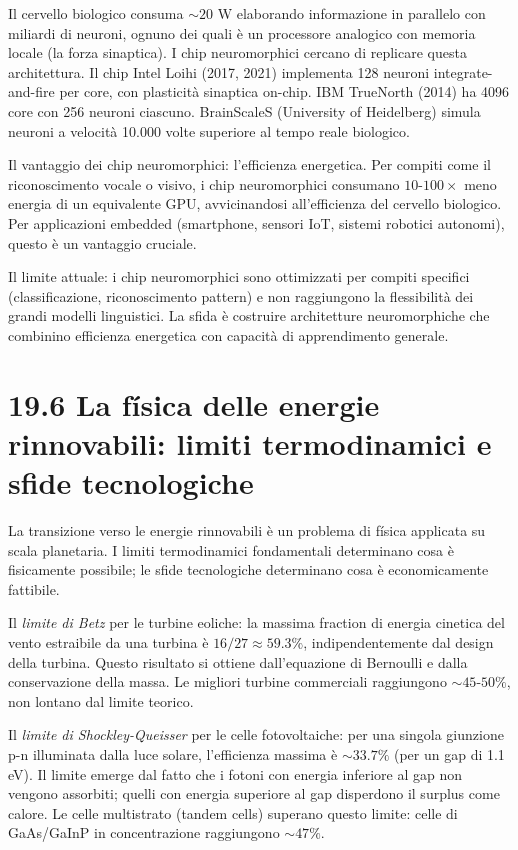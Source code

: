 \documentclass[11.5pt,a4paper,openany]{book}
\theoremstyle{remark}
\begin{document}
Il cervello biologico consuma $\sim 20$ W elaborando informazione in parallelo con miliardi di neuroni, ognuno dei quali è un processore analogico con memoria locale (la forza sinaptica). I chip neuromorphici cercano di replicare questa architettura. Il chip Intel Loihi (2017, 2021) implementa 128 neuroni integrate-and-fire per core, con plasticità sinaptica on-chip. IBM TrueNorth (2014) ha 4096 core con 256 neuroni ciascuno. BrainScaleS (University of Heidelberg) simula neuroni a velocità 10.000 volte superiore al tempo reale biologico.

Il vantaggio dei chip neuromorphici: l'efficienza energetica. Per compiti come il riconoscimento vocale o visivo, i chip neuromorphici consumano $10$-$100 \times$ meno energia di un equivalente GPU, avvicinandosi all'efficienza del cervello biologico. Per applicazioni embedded (smartphone, sensori IoT, sistemi robotici autonomi), questo è un vantaggio cruciale.

Il limite attuale: i chip neuromorphici sono ottimizzati per compiti specifici (classificazione, riconoscimento pattern) e non raggiungono la flessibilità dei grandi modelli linguistici. La sfida è costruire architetture neuromorphiche che combinino efficienza energetica con capacità di apprendimento generale.

\section{19.6 La física delle energie rinnovabili: limiti termodinamici e sfide tecnologiche}

La transizione verso le energie rinnovabili è un problema di física applicata su scala planetaria. I limiti termodinamici fondamentali determinano cosa è fisicamente possibile; le sfide tecnologiche determinano cosa è economicamente fattibile.

Il \textit{limite di Betz} per le turbine eoliche: la massima fraction di energia cinetica del vento estraibile da una turbina è $16/27 \approx 59.3\%$, indipendentemente dal design della turbina. Questo risultato si ottiene dall'equazione di Bernoulli e dalla conservazione della massa. Le migliori turbine commerciali raggiungono $\sim 45$-$50\%$, non lontano dal limite teorico.

Il \textit{limite di Shockley-Queisser} per le celle fotovoltaiche: per una singola giunzione p-n illuminata dalla luce solare, l'efficienza massima è $\sim 33.7\%$ (per un gap di 1.1 eV). Il limite emerge dal fatto che i fotoni con energia inferiore al gap non vengono assorbiti; quelli con energia superiore al gap disperdono il surplus come calore. Le celle multistrato (tandem cells) superano questo limite: celle di GaAs/GaInP in concentrazione raggiungono $\sim 47\%$.
\end{document}
